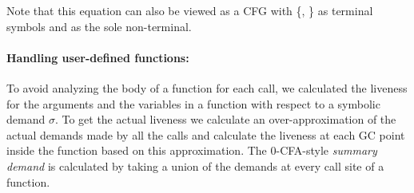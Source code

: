 \documentclass[9pt,preprint,nonatbib]{sigplanconf}
\begin{document}
Note that this equation can also be viewed as a CFG with \{\acdr,
\clazy\} as terminal symbols and  as the sole
non-terminal.

\paragraph{Handling user-defined functions:}
\label{sec:bodylivenessbodies}
To  avoid analyzing  the body  of a  function for  each
call, we calculated the  liveness for the arguments and
the variables in a function  with respect to a symbolic
demand  $\sigma$.   To  get   the  actual  liveness  we
calculate an  over-approximation of the  actual demands
made by  all the  calls and  calculate the  liveness at
each  GC  point  inside  the  function  based  on  this
approximation.  The 0-CFA-style {\em summary demand} is
calculated by  taking a union  of the demands  at every
call site of a function.

\end{document}
